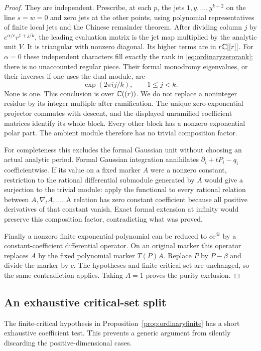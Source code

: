 \begin{proof}
They are independent. Prescribe, at each $p$, the jets
$1,y,\ldots,y^{k-2}$ on the line $s=w=0$ and zero jets at the
other points, using polynomial representatives of finite local
jets and the Chinese remainder theorem. After dividing column
$j$ by $e^{\alpha/r}r^{1+j/k}$, the leading evaluation matrix is
the jet map multiplied by the analytic unit $V$. It is triangular
with nonzero diagonal. Its higher terms are in $r\mathbb C[[r]]$.
For $\alpha=0$ these independent characters fill exactly the rank
in \eqref{eq:ordinaryzerorank}; there is no unaccounted regular
piece. Their formal monodromy eigenvalues, or their inverses if
one uses the dual module, are
\[
 \exp(2\pi i j/k),\qquad 1\le j<k.
\]
None is one. This conclusion is over $\mathbb C((r))$. We do not replace
a noninteger residue by its integer multiple after ramification.
The unique zero-exponential projector commutes with descent, and
the displayed unramified coefficient matrices identify its whole
block. Every other block has a nonzero exponential polar part.
The ambient module therefore has no trivial composition factor.

For completeness this excludes the formal Gaussian unit without
choosing an actual analytic period. Formal Gaussian integration
annihilates $\partial_i+tP_i-q_i$ coefficientwise. If its value
on a fixed marker $A$ were a nonzero constant, restriction to the
rational differential submodule generated by $A$ would give a
surjection to the trivial module: apply the functional to every
rational relation between $A,\nabla_tA,\ldots$. A relation has
zero constant coefficient because all positive derivatives of
that constant vanish. Exact formal extension at infinity would
preserve this composition factor, contradicting what was proved.

Finally a nonzero finite exponential-polynomial can be reduced
to $c e^{\beta t}$ by a constant-coefficient differential
operator. On an original marker this operator replaces $A$ by
the fixed polynomial marker $T(P)A$. Replace $P$ by $P-\beta$
and divide the marker by $c$. The hypotheses and finite critical
set are unchanged, so the same contradiction applies. Taking
$A=1$ proves the purity exclusion.
\end{proof}

\subsection{An exhaustive critical-set split}

The finite-critical hypothesis in Proposition~\ref{prop:ordinaryfinite}
has a short exhaustive coefficient test. This prevents a generic
argument from silently discarding the positive-dimensional cases.

